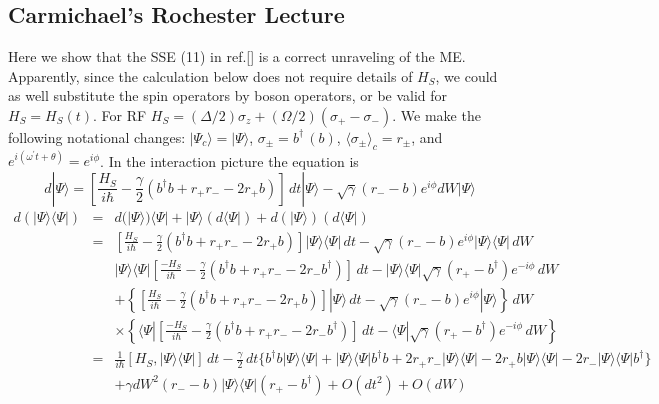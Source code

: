 \documentclass[twocolumn,aps,eqsecnum,showkeys,amsmath]{revtex4}
\begin{document}

\begin{widetext}
\subsection{Carmichael's Rochester Lecture}

Here we show that the SSE (11) in ref.[\cite{RochesHJC}] is a correct 
unraveling of the ME. Apparently, since the calculation below does 
not require details of $H_S$, we could as well substitute the spin 
operators by boson operators, or be valid for $H_S=H_S(t)$. For RF 
$H_S= (\Delta/2)\sigma_z +(\Omega/2)(\sigma_+ -\sigma_-)$. We make 
the following notational changes: $|\Psi_c\rangle =|\Psi \rangle$, 
$\sigma_{\pm}=b^\dag \,(b)$, $\langle \sigma_\pm \rangle_c =r_\pm$, 
and $e^{i(\omega^\prime t +\theta)} =e^{i\phi}$. In the interaction 
picture the equation is 
%
\begin{equation}
d|\Psi \rangle = [\frac{H_S}{i\hbar} 
	-\frac{\gamma}{2}(b^\dag b +r_+r_- -2r_+b)] \,dt |\Psi \rangle 
	-\sqrt{\gamma}(r_- -b)e^{i\phi} dW |\Psi \rangle  
\end{equation}
%
\begin{eqnarray*}
d(|\Psi\rangle \langle \Psi|) &=&
	d(|\Psi\rangle) \langle \Psi| +|\Psi\rangle (d\langle \Psi|) 
	+d(|\Psi\rangle) (d\langle \Psi|) 		\\		
%
&=& [\frac{H_S}{i\hbar} -\frac{\gamma}{2}(b^\dag b +r_+r_- -2r_+b)] 
	|\Psi \rangle \langle \Psi| \,dt  	
   -\sqrt{\gamma}(r_- -b)e^{i\phi} |\Psi \rangle\langle \Psi| \,dW \\
&& |\Psi \rangle \langle \Psi| [\frac{-H_S}{i\hbar} 
	-\frac{\gamma}{2}(b^\dag b +r_+r_- -2r_-b^\dag)] \,dt 
 -|\Psi \rangle\langle \Psi| \sqrt{\gamma}(r_+ -b^\dag)e^{-i\phi}\,dW \\
&&	+\left\{[\frac{H_S}{i\hbar} 
	-\frac{\gamma}{2}(b^\dag b +r_+r_- -2r_+b)] |\Psi \rangle \,dt 
	-\sqrt{\gamma}(r_- -b)e^{i\phi} |\Psi \rangle \right\} \,dW	\\
&&	\times \left\{ \langle \Psi| [\frac{-H_S}{i\hbar} 				
	-\frac{\gamma}{2}(b^\dag b +r_+r_- -2r_-b^\dag)] \,dt 
  -\langle\Psi| \sqrt{\gamma}(r_+ -b^\dag)e^{-i\phi} \,dW \right\} \\
%
&=& \frac{1}{i\hbar} [H_S, |\Psi\rangle \langle \Psi|] \,dt 
	-\frac{\gamma}{2}\,dt \{ b^\dag b |\Psi\rangle \langle \Psi| 
	+|\Psi \rangle \langle \Psi| b^\dag b 
  +2r_+r_- |\Psi\rangle\langle\Psi| -2r_+b |\Psi\rangle\langle\Psi| 
	-2r_- |\Psi\rangle\langle\Psi| b^\dag \}		\\
&&	+\gamma dW^2 (r_- -b)|\Psi\rangle\langle\Psi|(r_+ -b^\dag)
	+O(dt^2) +O(dW)
\end{eqnarray*}


\end{widetext}
\end{document}
